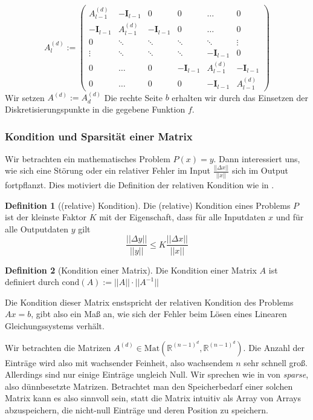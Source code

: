 \documentclass[smallheadings]{scrartcl}
\theoremstyle{definition}
\newtheorem{definition}{Definition}[section]
\begin{document}
		$$A^{(d)}_{l} := \begin{pmatrix}     A^{(d)}_{l-1} & -\mathbf{I}_{l-1} & 0 & 0 &\dots&0 \\    -\mathbf{I}_{l-1} & A^{(d)}_{l-1} & -\mathbf{I}_{l-1} & 0&\dots&0 \\    0&\ddots&\ddots&\ddots&\ddots&\vdots\\    \vdots & \ddots &\ddots&\ddots&-\mathbf{I}_{l-1}&0 \\    0 & \dots&0&-\mathbf{I}_{l-1}&A^{(d)}_{l-1}&-\mathbf{I}_{l-1}\\     0&  \dots&0&0&-\mathbf{I}_{l-1}&A^{(d)}_{l-1}    \end{pmatrix}$$
		Wir setzen $A^{(d)}:=A^{(d)}_d$ Die rechte Seite $b$ erhalten wir durch das Einsetzen der Diskretisierungspunkte in die gegebene Funktion $f$. 

		\subsubsection{Kondition und Sparsität einer Matrix}
		Wir betrachten ein mathematisches Problem $P(x)=y$. Dann interessiert uns, wie sich eine Störung oder ein relativer Fehler im Input $\frac{||\Delta x||}{||x||}$ sich im Output fortpflanzt. Dies motiviert die Definition der relativen Kondition wie in \citep{Skript}.
				\begin{definition}[(relative) Kondition]
		Die (relative) Kondition eines Problems $P$ ist der kleinste Faktor $K$ mit der Eigenschaft, dass für alle Inputdaten $x$ und für alle Outputdaten $y$ gilt 
		$$\frac{||\Delta y||}{||y||}\leq K\frac{||\Delta x||}{||x||}$$
		\end{definition}
		\begin{definition}[Kondition einer Matrix]
		Die Kondition einer Matrix $A$ ist definiert durch $\text{cond}(A):=||A||\cdot ||A^{-1}||$
		\end{definition}
		Die Kondition dieser Matrix enstspricht der relativen Kondition des Problems $Ax=b$, gibt also ein Maß an, wie sich der Fehler beim Lösen eines Linearen Gleichungssystems verhält. 

		Wir betrachten die Matrizen $A^{(d)} \in \text{Mat}(\mathbb{R}^{(n-1)^d},\mathbb{R}^{(n-1)^d})$. Die Anzahl der Einträge wird also mit wachsender Feinheit, also wachsendem $n$ sehr schnell groß. Allerdings sind nur einige Einträge ungleich Null. Wir sprechen wie in \citep{PDE} von \textit{sparse}, also dünnbesetzte Matrizen. Betrachtet man den Speicherbedarf einer solchen Matrix kann es also sinnvoll sein, statt die Matrix intuitiv als Array von Arrays abzuspeichern, die nicht-null Einträge und deren Position zu speichern. 
\end{document}
